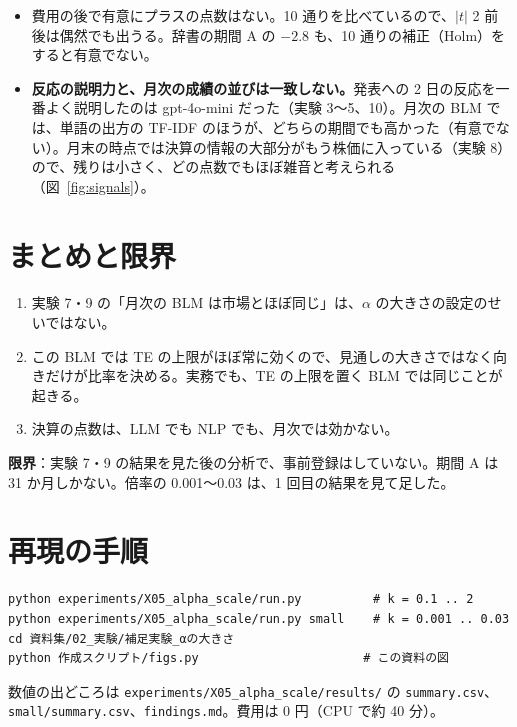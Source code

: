 \documentclass[xelatex,ja=standard,jafont=haranoaji,a4paper,10pt,openany]{bxjsreport}
\newcommand{\code}[1]{\texttt{#1}}
\newcommand{\figref}[1]{図~\ref{#1}}
\begin{document}
\begin{itemize}
\item 費用の後で有意にプラスの点数はない。10 通りを比べているので、$|t|$ 2 前後は偶然でも出うる。辞書の期間 A の $-2.8$ も、10 通りの補正（Holm）をすると有意でない。
\item \textbf{反応の説明力と、月次の成績の並びは一致しない。}発表への 2 日の反応を一番よく説明したのは gpt-4o-mini だった（実験 3〜5、10）。月次の BLM では、単語の出方の TF-IDF のほうが、どちらの期間でも高かった（有意でない）。月末の時点では決算の情報の大部分がもう株価に入っている（実験 8）ので、残りは小さく、どの点数でもほぼ雑音と考えられる（\figref{fig:signals}）。
\end{itemize}

\chapter{まとめと限界}\label{ch:summary}

\begin{enumerate}
\item 実験 7・9 の「月次の BLM は市場とほぼ同じ」は、$\alpha$ の大きさの設定のせいではない。
\item この BLM では TE の上限がほぼ常に効くので、見通しの大きさではなく向きだけが比率を決める。実務でも、TE の上限を置く BLM では同じことが起きる。
\item 決算の点数は、LLM でも NLP でも、月次では効かない。
\end{enumerate}

\textbf{限界}：実験 7・9 の結果を見た後の分析で、事前登録はしていない。期間 A は 31 か月しかない。倍率の 0.001〜0.03 は、1 回目の結果を見て足した。

\chapter*{再現の手順}

\begin{verbatim}
python experiments/X05_alpha_scale/run.py          # k = 0.1 .. 2
python experiments/X05_alpha_scale/run.py small    # k = 0.001 .. 0.03
cd 資料集/02_実験/補足実験_αの大きさ
python 作成スクリプト/figs.py                       # この資料の図
\end{verbatim}

数値の出どころは \code{experiments/X05\_alpha\_scale/results/} の \code{summary.csv}、\code{small/summary.csv}、\code{findings.md}。費用は 0 円（CPU で約 40 分）。
\end{document}
